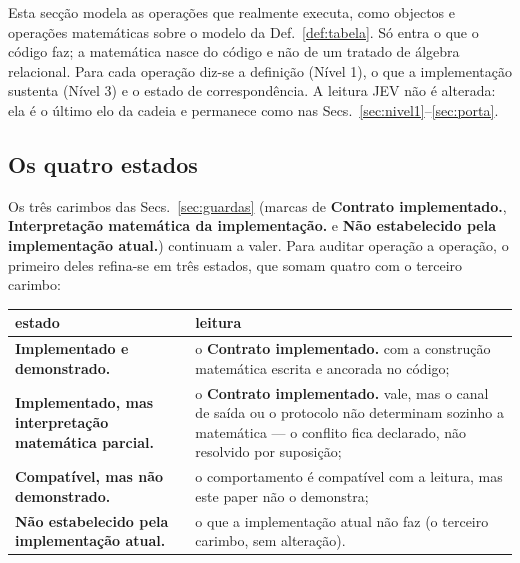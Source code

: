 \documentclass[11pt,a4paper]{article}
\newcommand{\cp}[1]{\texttt{\detokenize{#1}}}
\newcommand{\sti}{\textbf{Implementado e demonstrado.}}
\newcommand{\stipa}{\textbf{Implementado, mas interpreta\c{c}\~ao matem\'atica
  parcial.}}
\newcommand{\stco}{\textbf{Compat\'ivel, mas n\~ao demonstrado.}}
\newcommand{\stni}{\textbf{N\~ao estabelecido pela implementa\c{c}\~ao
  atual.}}
\begin{document}
Esta sec\c{c}\~ao modela as opera\c{c}\~oes que \cp{sql.c} realmente executa,
como objectos e opera\c{c}\~oes matem\'aticas sobre o modelo da
Def.~\ref{def:tabela}. S\'o entra o que o c\'odigo faz; a matem\'atica nasce do
c\'odigo e n\~ao de um tratado de \'algebra relacional. Para cada opera\c{c}\~ao
diz-se a defini\c{c}\~ao (N\'ivel 1), o que a implementa\c{c}\~ao sustenta
(N\'ivel 3) e o estado de correspond\^encia. A leitura JEV n\~ao \'e alterada:
ela \'e o \'ultimo elo da cadeia e permanece como nas
Secs.~\ref{sec:nivel1}--\ref{sec:porta}.

\subsection{Os quatro estados}
Os tr\^es carimbos das Secs.~\ref{sec:guardas} (marcas de
\textbf{Contrato implementado.}, \textbf{Interpreta\c{c}\~ao matem\'atica da
implementa\c{c}\~ao.} e \textbf{N\~ao estabelecido pela implementa\c{c}\~ao
atual.}) continuam a valer. Para auditar
opera\c{c}\~ao a opera\c{c}\~ao, o primeiro deles refina-se em tr\^es estados,
que somam quatro com o terceiro carimbo:

\begin{center}
\begin{tabular}{@{}p{6.2cm} p{9.0cm}@{}}
\toprule
estado & leitura \\
\midrule
\sti & o \textbf{Contrato implementado.} com a constru\c{c}\~ao matem\'atica
escrita e ancorada no c\'odigo; \\
\stipa & o \textbf{Contrato implementado.} vale, mas o canal de sa\'ida ou o
protocolo n\~ao determinam sozinho a matem\'atica --- o conflito fica
declarado, n\~ao resolvido por suposi\c{c}\~ao; \\
\stco & o comportamento \'e compat\'ivel com a leitura, mas este paper n\~ao o
demonstra; \\
\stni & o que a implementa\c{c}\~ao atual n\~ao faz (o terceiro carimbo, sem
altera\c{c}\~ao). \\
\bottomrule
\end{tabular}
\end{center}
\end{document}
